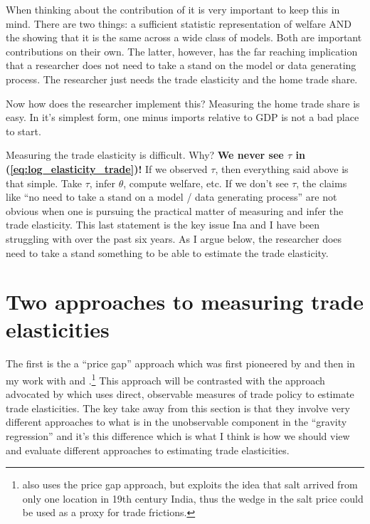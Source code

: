 \documentclass[pdftex,12pt]{article}
\begin{document}
\bigskip

When thinking about the contribution of \citet{arkolakis2012new} it is very important to keep this in mind. There are two things: a sufficient statistic representation of welfare AND the showing that it is the same across a wide class of models. Both are important contributions on their own. The latter, however, has the far reaching implication that a researcher does not need to take a stand on the model or data generating process. The researcher just needs the trade elasticity and the home trade share.

Now how does the researcher implement this? Measuring the home trade share is easy. In it's simplest form, one minus imports relative to GDP is not a bad place to start.

Measuring the trade elasticity is difficult. Why? \textbf{We never see $\tau$ in (\ref{eq:log_elasticity_trade})!} If we observed $\tau$, then everything said above is that simple. Take $\tau$, infer $\theta$, compute welfare, etc. If we don't see $\tau$, the claims like ``no need to take a stand on a model / data generating process'' are not obvious when one is pursuing the practical matter of measuring and infer the trade elasticity. This last statement is the key issue Ina and I have been struggling with over the past six years. As I argue below, the researcher does need to take a stand something to be able to estimate the trade elasticity.

\section{Two approaches to measuring trade elasticities}

The first is the a ``price gap'' approach which was first pioneered by \citet{eaton2002technology} and then in my work with \citet{sw_jie} and \citet{simonovska2014trade}.\footnote{\citet{donaldson09} also uses the price gap approach, but exploits the idea that salt arrived from only one location in 19th century India, thus the wedge in the salt price could be used as a proxy for trade frictions.} This approach will be contrasted with the approach advocated by \citet{arkolakis2012new} which uses direct, observable measures of trade policy to estimate trade elasticities. The key take away from this section is that they involve very different approaches to what is in the unobservable component in the ``gravity regression'' and it's this difference which is what I think is how we should view and evaluate different approaches to estimating trade elasticities.
\end{document}
